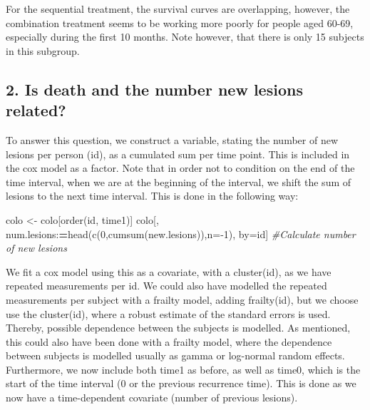 \documentclass[
  11pt,
]{article}
\newenvironment{Shaded}{\begin{snugshade}}{\end{snugshade}}
\newcommand{\AttributeTok}[1]{\textcolor[rgb]{0.77,0.63,0.00}{#1}}
\newcommand{\CommentTok}[1]{\textcolor[rgb]{0.56,0.35,0.01}{\textit{#1}}}
\newcommand{\DecValTok}[1]{\textcolor[rgb]{0.00,0.00,0.81}{#1}}
\newcommand{\ErrorTok}[1]{\textcolor[rgb]{0.64,0.00,0.00}{\textbf{#1}}}
\newcommand{\FunctionTok}[1]{\textcolor[rgb]{0.00,0.00,0.00}{#1}}
\newcommand{\NormalTok}[1]{#1}
\newcommand{\OtherTok}[1]{\textcolor[rgb]{0.56,0.35,0.01}{#1}}
\newcommand{\SpecialCharTok}[1]{\textcolor[rgb]{0.00,0.00,0.00}{#1}}
\begin{document}
For the sequential treatment, the survival curves are overlapping,
however, the combination treatment seems to be working more poorly for
people aged 60-69, especially during the first 10 months. Note however,
that there is only 15 subjects in this subgroup.

\hypertarget{is-death-and-the-number-new-lesions-related}{%
\subsection{2. Is death and the number new lesions
related?}\label{is-death-and-the-number-new-lesions-related}}

To answer this question, we construct a variable, stating the number of
new lesions per person (id), as a cumulated sum per time point. This is
included in the cox model as a factor. Note that in order not to
condition on the end of the time interval, when we are at the beginning
of the interval, we shift the sum of lesions to the next time interval.
This is done in the following way:

\begin{Shaded}
\begin{Highlighting}[]
\NormalTok{colo }\OtherTok{\textless{}{-}}\NormalTok{ colo[}\FunctionTok{order}\NormalTok{(id, time1)]}
\NormalTok{colo[, num.lesions}\SpecialCharTok{:}\ErrorTok{=}\FunctionTok{head}\NormalTok{(}\FunctionTok{c}\NormalTok{(}\DecValTok{0}\NormalTok{,}\FunctionTok{cumsum}\NormalTok{(new.lesions)),}\AttributeTok{n=}\SpecialCharTok{{-}}\DecValTok{1}\NormalTok{), by}\OtherTok{=}\NormalTok{id] }\CommentTok{\#Calculate number of new lesions}
\end{Highlighting}
\end{Shaded}

We fit a cox model using this as a covariate, with a cluster(id), as we
have repeated measurements per id. We could also have modelled the
repeated measurements per subject with a frailty model, adding
frailty(id), but we choose use the cluster(id), where a robust estimate
of the standard errors is used. Thereby, possible dependence between the
subjects is modelled. As mentioned, this could also have been done with
a frailty model, where the dependence between subjects is modelled
usually as gamma or log-normal random effects. Furthermore, we now
include both time1 as before, as well as time0, which is the start of
the time interval (0 or the previous recurrence time). This is done as
we now have a time-dependent covariate (number of previous lesions).
\end{document}
